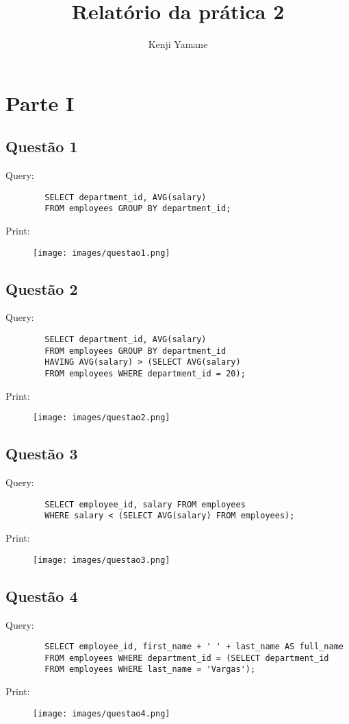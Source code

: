 \documentclass{article}[twocolumn]
\title{Relat\'orio da pr\'atica 2}
\author{Kenji Yamane}
\begin{document}
	\maketitle
	\section{Parte I}
	\subsection{Quest\~ao 1}
	Query:
	\begin{verbatim}
		SELECT department_id, AVG(salary)
		FROM employees GROUP BY department_id;
	\end{verbatim}
	Print:
	\begin{figure}[H]
		\centering
		\texttt{[image: images/questao1.png]}
	\end{figure}
	\newpage
	\subsection{Quest\~ao 2}
	Query:
	\begin{verbatim}
		SELECT department_id, AVG(salary)
		FROM employees GROUP BY department_id
		HAVING AVG(salary) > (SELECT AVG(salary)
		FROM employees WHERE department_id = 20);
	\end{verbatim}
	Print:
	\begin{figure}[H]
		\centering
		\texttt{[image: images/questao2.png]}
	\end{figure}
	\newpage
	\subsection{Quest\~ao 3}
	Query:
	\begin{verbatim}
		SELECT employee_id, salary FROM employees
		WHERE salary < (SELECT AVG(salary) FROM employees);
	\end{verbatim}
	Print:
	\begin{figure}[H]
		\centering
		\texttt{[image: images/questao3.png]}
	\end{figure}
	\newpage
	\subsection{Quest\~ao 4}
	Query:
	\begin{verbatim}
		SELECT employee_id, first_name + ' ' + last_name AS full_name
		FROM employees WHERE department_id = (SELECT department_id
		FROM employees WHERE last_name = 'Vargas');
	\end{verbatim}
	Print:
	\begin{figure}[H]
		\centering
		\texttt{[image: images/questao4.png]}
	\end{figure}
	\newpage
\end{document}
